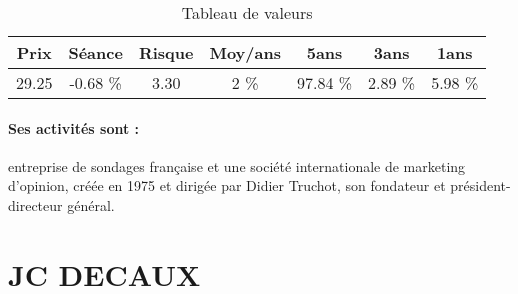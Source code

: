 \documentclass[11pt,a4paper]{report}%
\begin{document}
\begin{table}[H]
  \centering
    \begin{tabular}{|c|c|c|c|c|c|c|}
    \hline
    Prix & Séance & Risque  & Moy/ans & 5ans & 3ans & 1ans \\
    \hline
    29.25 &    -0.68 \%    & 3.30 & 2 \% & 97.84 \% & 2.89 \% & 5.98 \% \\
    \hline
    \end{tabular}%
        \label{tab:table_IPSOS}%
      \caption{Tableau de valeurs}
\end{table}%

\paragraph{Ses activités sont : }  entreprise de sondages française et une société internationale de marketing d’opinion, créée en 1975 et dirigée par Didier Truchot, son fondateur et président-directeur général.  
    
    \newpage

\section{JC DECAUX}
\end{document}
